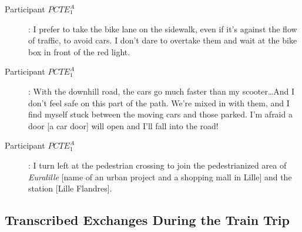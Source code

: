 \begin{description}%
    \item[Participant \(PCTE^{A}_{1}\)]: I prefer to take the bike lane on the sidewalk, even if it's against the flow of traffic, to avoid cars. I don't dare to overtake them and wait at the bike box in front of the red light.
    \item[Participant \(PCTE^{A}_{1}\)]: With the downhill road, the cars go much faster than my scooter\dots And I don't feel safe on this part of the path. We’re mixed in with them, and I find myself stuck between the moving cars and those parked. I’m afraid a door [a car door] will open and I’ll fall into the road!
    \item[Participant \(PCTE^{A}_{1}\)]: I turn left at the pedestrian crossing to join the pedestrianized area of \textsl{Euralille} [name of an urban project and a shopping mall in Lille] and the station [Lille Flandres].
\end{description}

\subsection{Transcribed Exchanges During the Train Trip}

